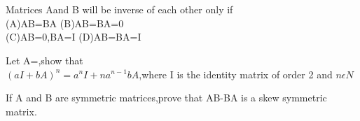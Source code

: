   
  \item{}\\
  \item{}\\
  \item{}\\
  \item {}\\
  \item {}\\
  \item {}\\
  \item {}\\
  \item {}\\
  \item {}\\
  \item {}\\
  \item {}\\
  \item {}\\
  
  \item Matrices Aand B will be inverse of each other only if\\
  (A)AB=BA (B)AB=BA=0\\
  (C)AB=0,BA=I (D)AB=BA=I\\
  
  \item Let A=,show that \\$(aI+bA)^{n}=a^{n}I+na^{n-1}bA$,where I is the identity matrix of order 2 and $n \epsilon N$\\

  \item If A and B are symmetric matrices,prove that AB-BA is a skew symmetric matrix.\\
  
